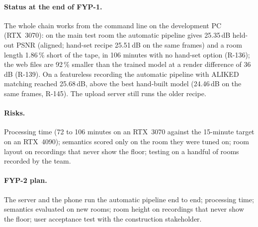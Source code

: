 \paragraph{Status at the end of FYP-1.} The whole chain works from the command line on the development PC
(RTX~3070): on the main test room the automatic pipeline gives 25.35\,dB held-out PSNR (aligned; hand-set recipe 25.51\,dB on the same frames) and a room length
1.86\,\% short of the tape, in 106 minutes with no hand-set option (R-136); the web files are 92\,\% smaller than the
trained model at a render difference of 36\,dB (R-139). On a featureless recording the automatic pipeline with
ALIKED matching reached 25.68\,dB, above the best hand-built model (24.46\,dB on the same frames, R-145). The upload
server still runs the older recipe.

\paragraph{Risks.} Processing time (72 to 106 minutes on an RTX~3070 against the 15-minute target on an RTX~4090);
semantics scored only on the room they were tuned on; room layout on recordings that never show the floor; testing on
a handful of rooms recorded by the team.

\paragraph{FYP-2 plan.} The server and the phone run the automatic pipeline end to end; processing time; semantics
evaluated on new rooms; room height on recordings that never show the floor; user acceptance test with the
construction stakeholder.
